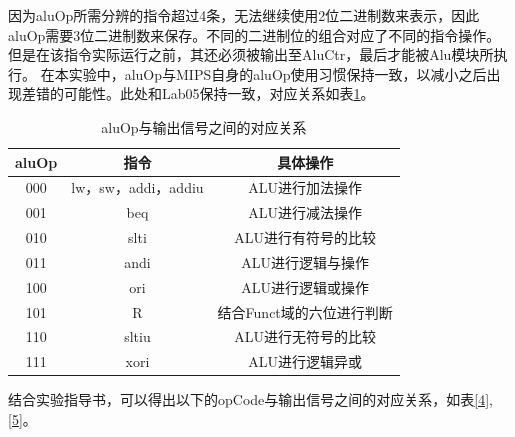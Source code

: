 因为aluOp所需分辨的指令超过4条，无法继续使用2位二进制数来表示，因此aluOp需要3位二进制数来保存。不同的二进制位的组合对应了不同的指令操作。但是在该指令实际运行之前，其还必须被输出至AluCtr，最后才能被Alu模块所执行。
在本实验中，aluOp与MIPS自身的aluOp使用习惯保持一致，以减小之后出现差错的可能性。此处和Lab05保持一致，对应关系如表\ref{3}。

\begin{table}[H]
    \centering
    \begin{tabular}{c|c|c}
    \hline
        aluOp& 指令 & 具体操作\\
        \hline
        000 & lw，sw，addi，addiu &ALU进行加法操作\\
        001 &beq&ALU进行减法操作\\
        010 & slti&ALU进行有符号的比较\\
        011 & andi&ALU进行逻辑与操作\\
        100 & ori&ALU进行逻辑或操作\\
        101 & R&结合Funct域的六位进行判断\\
        110 & sltiu&ALU进行无符号的比较\\
        111 & xori&ALU进行逻辑异或\\
        \hline
        
    \end{tabular}
    \caption{aluOp与输出信号之间的对应关系}
    \label{3}
\end{table}

结合实验指导书，可以得出以下的opCode与输出信号之间的对应关系，如表\ref{4},\ref{5}。

